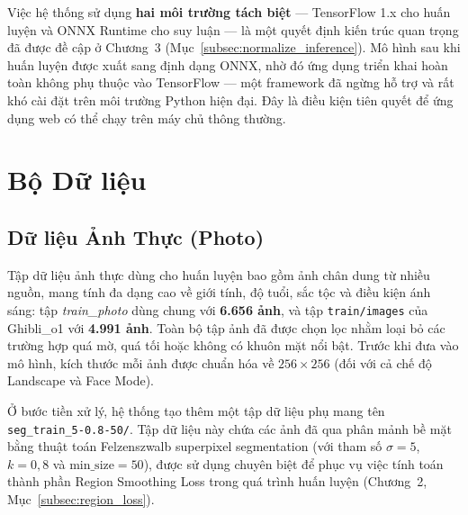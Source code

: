 
Việc hệ thống sử dụng \textbf{hai môi trường tách biệt} --- TensorFlow 1.x cho huấn luyện và ONNX Runtime cho suy luận --- là một quyết định kiến trúc quan trọng đã được đề cập ở Chương~3 (Mục~\ref{subsec:normalize_inference}). Mô hình sau khi huấn luyện được xuất sang định dạng ONNX, nhờ đó ứng dụng triển khai hoàn toàn không phụ thuộc vào TensorFlow --- một framework đã ngừng hỗ trợ và rất khó cài đặt trên môi trường Python hiện đại. Đây là điều kiện tiên quyết để ứng dụng web có thể chạy trên máy chủ thông thường.

\section{Bộ Dữ liệu}
\label{sec:dataset}

\subsection{Dữ liệu Ảnh Thực (Photo)}
\label{subsec:photo_data}

Tập dữ liệu ảnh thực dùng cho huấn luyện bao gồm ảnh chân dung từ nhiều nguồn, mang tính đa dạng cao về giới tính, độ tuổi, sắc tộc và điều kiện ánh sáng: tập \textit{train\_photo} dùng chung với \textbf{6.656 ảnh}, và tập \texttt{train/images} của Ghibli\_o1 với \textbf{4.991 ảnh}. Toàn bộ tập ảnh đã được chọn lọc nhằm loại bỏ các trường hợp quá mờ, quá tối hoặc không có khuôn mặt nổi bật. Trước khi đưa vào mô hình, kích thước mỗi ảnh được chuẩn hóa về $256 \times 256$ (đối với cả chế độ Landscape và Face Mode).

Ở bước tiền xử lý, hệ thống tạo thêm một tập dữ liệu phụ mang tên \texttt{seg\_train\_5-0.8-50/}. Tập dữ liệu này chứa các ảnh đã qua phân mảnh bề mặt bằng thuật toán Felzenszwalb superpixel segmentation (với tham số $\sigma=5$, $k=0{,}8$ và $\text{min\_size}=50$), được sử dụng chuyên biệt để phục vụ việc tính toán thành phần Region Smoothing Loss trong quá trình huấn luyện (Chương~2, Mục~\ref{subsec:region_loss}).


